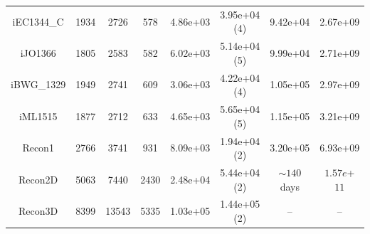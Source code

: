 \documentclass{beamer}
\begin{document}
\begin{frame}
\begin{table}[]
{\begin{tabular}{|c||c|c|c||c|c||c|c|}
               iEC1344\_C  & 1934 & 2726 & 578  & 4.86e+03 & 3.95e+04 (4) & 9.42e+04   & 2.67e+09 \\
               iJO1366  & 1805 & 2583 & 582 & 6.02e+03 & 5.14e+04 (5)  & 9.99e+04  & 2.71e+09 \\
               iBWG\_1329 & 1949 & 2741 & 609 & 3.06e+03 & 4.22e+04 (4) & 1.05e+05   & 2.97e+09 \\
               iML1515 & 1877 & 2712 & 633 &  4.65e+03 & 5.65e+04 (5)  & 1.15e+05   & 3.21e+09 \\
               Recon1 & 2766 & 3741 & 931 & 8.09e+03 & 1.94e+04 (2) & 3.20e+05  & 6.93e+09 \\
               Recon2D & 5063 & 7440 & 2430 & 2.48e+04  &  5.44e+04 (2)  & $\sim 140$ days & $1.57e$+$11$   \\
               Recon3D  & 8399 & 13543 & 5335 & 1.03e+05 &  1.44e+05 (2) & -- & -- \\
               \hline
               \end{tabular}%
         }
      \end{table}

   \end{frame}
   \fi
\end{document}
